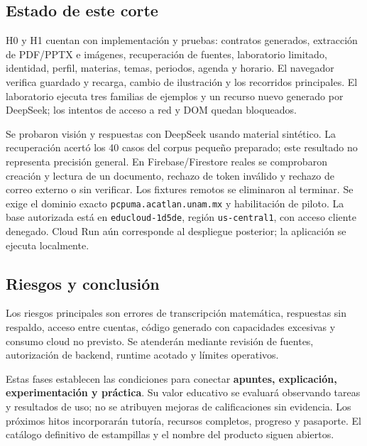 \subsection*{Estado de este corte}
H0 y H1 cuentan con implementación y pruebas: contratos generados, extracción de PDF/PPTX e imágenes, recuperación de fuentes, laboratorio limitado, identidad, perfil, materias, temas, periodos, agenda y horario. El navegador verifica guardado y recarga, cambio de ilustración y los recorridos principales. El laboratorio ejecuta tres familias de ejemplos y un recurso nuevo generado por DeepSeek; los intentos de acceso a red y DOM quedan bloqueados.

Se probaron visión y respuestas con DeepSeek usando material sintético. La recuperación acertó los 40 casos del corpus pequeño preparado; este resultado no representa precisión general. En Firebase/Firestore reales se comprobaron creación y lectura de un documento, rechazo de token inválido y rechazo de correo externo o sin verificar. Los fixtures remotos se eliminaron al terminar. Se exige el dominio exacto \texttt{pcpuma.acatlan.unam.mx} y habilitación de piloto. La base autorizada está en \texttt{educloud-1d5de}, región \texttt{us-central1}, con acceso cliente denegado. Cloud Run aún corresponde al despliegue posterior; la aplicación se ejecuta localmente.

\subsection*{Riesgos y conclusión}
Los riesgos principales son errores de transcripción matemática, respuestas sin respaldo, acceso entre cuentas, código generado con capacidades excesivas y consumo cloud no previsto. Se atenderán mediante revisión de fuentes, autorización de backend, runtime acotado y límites operativos.

Estas fases establecen las condiciones para conectar \textbf{apuntes, explicación, experimentación y práctica}. Su valor educativo se evaluará observando tareas y resultados de uso; no se atribuyen mejoras de calificaciones sin evidencia. Los próximos hitos incorporarán tutoría, recursos completos, progreso y pasaporte. El catálogo definitivo de estampillas y el nombre del producto siguen abiertos.

